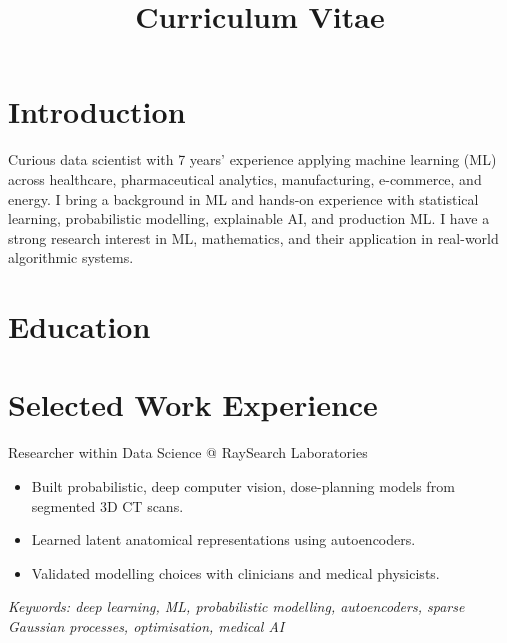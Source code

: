 \documentclass[11pt,a4paper]{moderncv}
\title{Curriculum Vitae}
\begin{document}
\makecvtitle

\section*{Introduction}
Curious data scientist with 7 years' experience applying machine learning (ML) across healthcare, pharmaceutical analytics, manufacturing, e-commerce, and energy. I bring a background in ML and hands-on experience with statistical learning, probabilistic modelling, explainable AI, and production ML. I have a strong research interest in ML, mathematics, and their application in real-world algorithmic systems.


\section{Education}



\section{Selected Work Experience}

\large{Researcher within Data Science @ RaySearch Laboratories}
\normalsize
\begin{itemize}
    \item Built probabilistic, deep computer vision, dose-planning models from segmented 3D CT scans.
    \item Learned latent anatomical representations using autoencoders.
    \item Validated modelling choices with clinicians and medical physicists.
\end{itemize}

{\footnotesize\textit{Keywords: deep learning, ML, probabilistic modelling, autoencoders, sparse Gaussian processes, optimisation, medical AI}}
\end{document}
